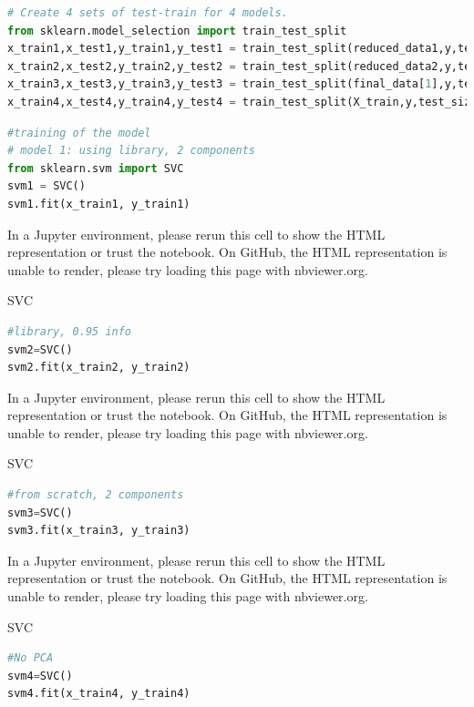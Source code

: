 \documentclass[
]{article}
\begin{document}
\begin{lstlisting}[language=Python]
# Create 4 sets of test-train for 4 models.
from sklearn.model_selection import train_test_split
x_train1,x_test1,y_train1,y_test1 = train_test_split(reduced_data1,y,test_size=0.2)   # using library, 2 components
x_train2,x_test2,y_train2,y_test2 = train_test_split(reduced_data2,y,test_size=0.2)   # using library, 0.95 info
x_train3,x_test3,y_train3,y_test3 = train_test_split(final_data[1],y,test_size=0.2)   # from scratch, 2 components
x_train4,x_test4,y_train4,y_test4 = train_test_split(X_train,y,test_size=0.2)         # no PCA
\end{lstlisting}

\begin{lstlisting}[language=Python]
#training of the model
# model 1: using library, 2 components
from sklearn.svm import SVC
svm1 = SVC()
svm1.fit(x_train1, y_train1)
\end{lstlisting}

\hypertarget{sk-container-id-33}{}
In a Jupyter environment, please rerun this cell to show the HTML
representation or trust the notebook. On GitHub, the HTML representation
is unable to render, please try loading this page with nbviewer.org.

SVC

\begin{lstlisting}[language=Python]
#library, 0.95 info
svm2=SVC()
svm2.fit(x_train2, y_train2)
\end{lstlisting}

\hypertarget{sk-container-id-34}{}
In a Jupyter environment, please rerun this cell to show the HTML
representation or trust the notebook. On GitHub, the HTML representation
is unable to render, please try loading this page with nbviewer.org.

SVC

\begin{lstlisting}[language=Python]
#from scratch, 2 components
svm3=SVC()
svm3.fit(x_train3, y_train3)
\end{lstlisting}

\hypertarget{sk-container-id-35}{}
In a Jupyter environment, please rerun this cell to show the HTML
representation or trust the notebook. On GitHub, the HTML representation
is unable to render, please try loading this page with nbviewer.org.

SVC

\begin{lstlisting}[language=Python]
#No PCA
svm4=SVC()
svm4.fit(x_train4, y_train4)
\end{lstlisting}
\end{document}
